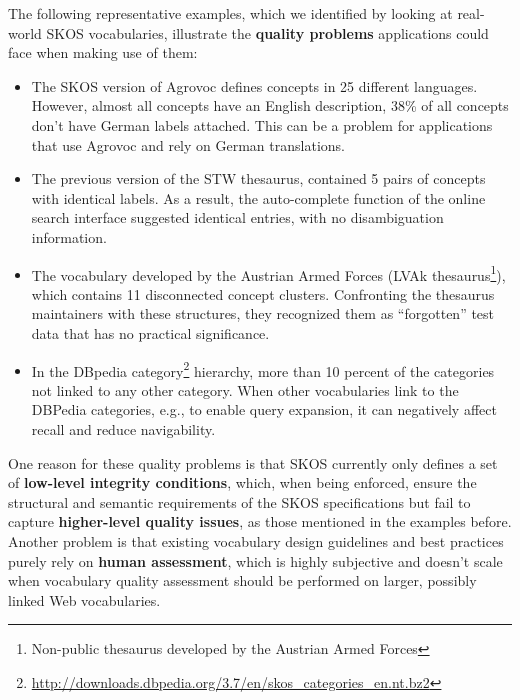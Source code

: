 The following representative examples, which we identified by looking at real-world SKOS vocabularies, illustrate the \textbf{quality problems} applications could face when making use of them:
\begin{itemize}
	\item The SKOS version of Agrovoc defines concepts in 25 different languages. However, almost all concepts have an English description, 38\% of all concepts don’t have German labels attached. This can be a problem for applications that use Agrovoc and rely on German translations.

	\item The previous version of the STW thesaurus, contained 5 pairs of concepts with identical labels. As a result, the auto-complete function of the online search interface suggested identical entries, with no disambiguation information.

	\item The vocabulary developed by the Austrian Armed Forces (LVAk thesaurus\footnote{Non-public thesaurus developed by the Austrian Armed Forces}), which contains 11 disconnected concept clusters. Confronting the thesaurus maintainers with these structures, they recognized them as “forgotten” test data that has no practical significance.

	\item In the DBpedia category\footnote{\url{http://downloads.dbpedia.org/3.7/en/skos_categories_en.nt.bz2}} hierarchy, more than 10 percent of the categories not linked to any other category. When other vocabularies link to the DBPedia categories, e.g., to enable query expansion, it can negatively affect recall and reduce navigability.
\end{itemize}

One reason for these quality problems is that SKOS currently only defines a set of \textbf{low-level integrity conditions}, which, when being enforced, ensure the structural and semantic requirements of the SKOS specifications but fail to capture \textbf{higher-level quality issues}, as those mentioned in the examples before. Another problem is that existing vocabulary design guidelines and best practices purely rely on \textbf{human assessment}, which is highly subjective and doesn’t scale when vocabulary quality assessment should be performed on larger, possibly linked Web vocabularies.

